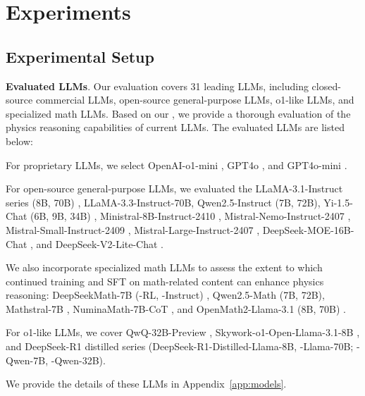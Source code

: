 \section{Experiments}\label{sec: experiments}

\subsection{Experimental Setup}

\textbf{Evaluated LLMs}.
Our evaluation covers 31 leading LLMs, including closed-source commercial LLMs, open-source general-purpose LLMs, o1-like LLMs, and specialized math LLMs.
Based on our {\benchmark}, we provide a thorough evaluation of the physics reasoning capabilities of current LLMs. 
The evaluated LLMs are listed below:

For proprietary LLMs, we select OpenAI-o1-mini \citep{o1}, GPT4o \citep{gpt4o2024openai}, and GPT4o-mini \citep{gpt4o2024openai}.

For open-source general-purpose LLMs, we evaluated the LLaMA-3.1-Instruct series (8B, 70B) \citep{llama312024dubey}, LLaMA-3.3-Instruct-70B, Qwen2.5-Instruct (7B, 72B)\citep{qwen252024Yang}, Yi-1.5-Chat (6B, 9B, 34B) \citep{ai2024yi}, Ministral-8B-Instruct-2410 \citep{ministral8b}, Mistral-Nemo-Instruct-2407 \citep{mistral_nemo_blog}, Mistral-Small-Instruct-2409 \citep{mistral_small_blog}, Mistral-Large-Instruct-2407 \citep{mistral_large_blog}, DeepSeek-MOE-16B-Chat \citep{dai2024deepseekmoe}, and DeepSeek-V2-Lite-Chat \citep{deepseekv2}.

We also incorporate specialized math LLMs to assess the extent to which continued training and SFT on math-related content can enhance physics reasoning: DeepSeekMath-7B (-RL, -Instruct) \citep{deepseekmath2024shao}, Qwen2.5-Math (7B, 72B)\citep{Qwen25Math2024Yang}, Mathstral-7B \citep{mathstral2023}, NuminaMath-7B-CoT \citep{numinamath7b}, and OpenMath2-Llama-3.1 (8B, 70B) \citep{openmathinstruct2024toshniwal}.

For o1-like LLMs, we cover QwQ-32B-Preview \citep{qwq32b_blog}, Skywork-o1-Open-Llama-3.1-8B \citep{skyworkmodelcard}, and DeepSeek-R1 \citep{deepseekr12025deepseekai} distilled series (DeepSeek-R1-Distilled-Llama-8B, -Llama-70B; -Qwen-7B, -Qwen-32B). 

We provide the details of these LLMs in Appendix~\ref{app:models}.


